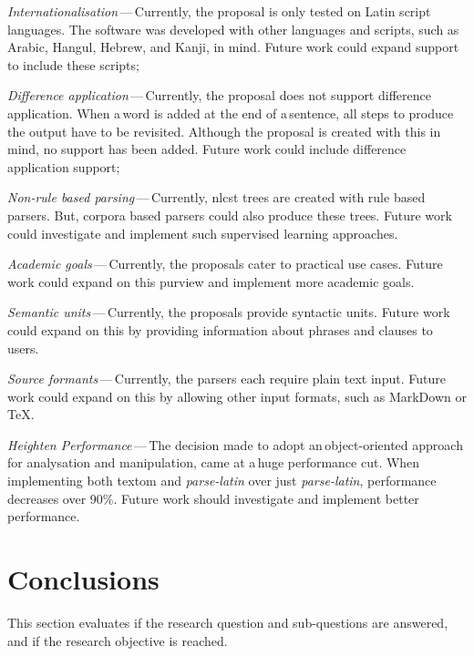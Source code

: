\begin{aenumerate}
\item\emph{Internationalisation}\,---\,Currently, the proposal is only
    tested on Latin script languages.
  The software was developed with other languages and scripts, such as
    Arabic, Hangul, Hebrew, and Kanji, in mind.
  Future work could expand support to include these scripts;
\item\emph{Difference application}\,---\,Currently, the proposal does not
    support difference application.
  When a\,word is added at the end of a\,sentence, all steps to produce the
    output have to be revisited.
  Although the proposal is created with this in mind, no support has been
    added.
  Future work could include difference application support;
\item\emph{Non-rule based parsing}\,---\,Currently, \gls{nlcst} trees are
    created with rule based parsers.
  But, corpora based parsers could also produce these trees.
  Future work could investigate and implement such supervised learning
    approaches.
\item\emph{Academic goals}\,---\,Currently, the proposals cater to practical use
    cases.
  Future work could expand on this purview and implement more academic
    goals.
\item\emph{Semantic units}\,---\,Currently, the proposals provide syntactic
    units.
  Future work could expand on this by providing information about phrases
    and clauses to users.
\item\emph{Source formants}\,---\,Currently, the parsers each require plain
    text input.
  Future work could expand on this by allowing other input formats, such as
    MarkDown or \TeX.
\item\emph{Heighten Performance}\,---\,The decision made to adopt
    an\,object-oriented approach for analysation and manipulation, came at
    a\,huge performance cut.
  When implementing both \gls{textom} and \emph{parse-latin} over just
    \emph{parse-latin}, performance decreases over 90\%.
  Future work should investigate and implement better performance.
\end{aenumerate}

\section{Conclusions}\label{conclusions}

This section evaluates if the research question and sub-questions are
  answered, and if the research objective is reached.

